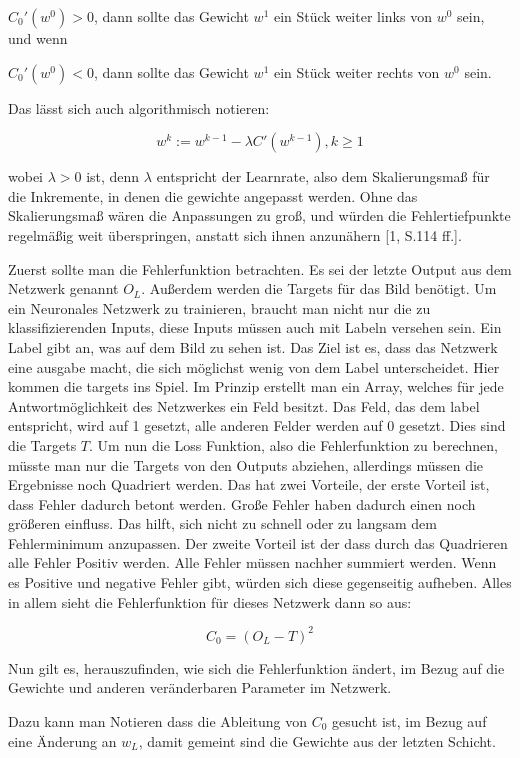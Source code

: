 \documentclass[12pt]{article}
\begin{document}
$C_0'(w^0)>0$, dann sollte das Gewicht $w^1$ ein Stück weiter links von $w^0$ sein, und wenn

$C_0'(w^0)<0$, dann sollte das Gewicht $w^1$ ein Stück weiter rechts von $w^0$ sein.

Das lässt sich auch algorithmisch notieren:

$$w^k:=w^{k-1}-\lambda C'(w^{k-1}), k \geq 1$$

wobei $\lambda > 0$ ist, denn $\lambda$ entspricht der Learnrate, also dem Skalierungsmaß für die Inkremente, in denen die gewichte angepasst werden. Ohne das Skalierungsmaß wären die Anpassungen zu groß, und würden die Fehlertiefpunkte regelmäßig weit überspringen, anstatt sich ihnen anzunähern [1, S.114 ff.]. 

Zuerst sollte man die Fehlerfunktion betrachten. 
Es sei der letzte Output aus dem Netzwerk genannt $O_L$. Außerdem werden die Targets für das Bild benötigt. Um ein Neuronales Netzwerk zu trainieren, braucht man nicht nur die zu klassifizierenden Inputs, diese Inputs müssen auch mit Labeln versehen sein. Ein Label gibt an, was auf dem Bild zu sehen ist. Das Ziel ist es, dass das Netzwerk eine ausgabe macht, die sich möglichst wenig von dem Label unterscheidet. Hier kommen die targets ins Spiel. Im Prinzip erstellt man ein Array, welches für jede Antwortmöglichkeit des Netzwerkes ein Feld besitzt. Das Feld, das dem label entspricht, wird auf 1 gesetzt, alle anderen Felder werden auf 0 gesetzt. Dies sind die Targets $T$.
Um nun die Loss Funktion, also die Fehlerfunktion zu berechnen, müsste man nur die Targets von den Outputs abziehen, allerdings müssen die Ergebnisse noch Quadriert werden. Das hat zwei Vorteile, der erste Vorteil ist, dass Fehler dadurch betont werden. Große Fehler haben dadurch einen noch größeren einfluss. Das hilft, sich nicht zu schnell oder zu langsam dem Fehlerminimum anzupassen. Der zweite Vorteil ist der dass durch das Quadrieren alle Fehler Positiv werden. Alle Fehler müssen nachher summiert werden. Wenn es Positive und negative Fehler gibt, würden sich diese gegenseitig aufheben. 
Alles in allem sieht die Fehlerfunktion für dieses Netzwerk dann so aus:

$$C_0 = (O_L - T)^2$$

Nun gilt es, herauszufinden, wie sich die Fehlerfunktion ändert, im Bezug auf die Gewichte und anderen veränderbaren Parameter im Netzwerk.

Dazu kann man Notieren dass die Ableitung von $C_0$ gesucht ist, im Bezug auf eine Änderung an $w_L$, damit gemeint sind die Gewichte aus der letzten Schicht.
\end{document}
